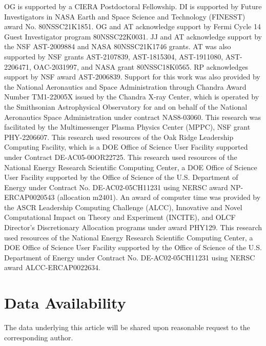 \documentclass[twocolumn,dvipsnames]{aastex62}
\begin{document}
\begin{acknowledgements}

OG is supported by a CIERA Postdoctoral Fellowship.
DI is supported by Future Investigators in NASA Earth and Space Science and Technology (FINESST) award No. 80NSSC21K1851. %
OG and AT acknowledge support by Fermi Cycle 14 Guest Investigator program 80NSSC22K0031.
JJ and AT acknowledge support by the NSF AST-2009884 and NASA 80NSSC21K1746 grants.
AT was also supported by NSF grants
AST-2107839, %
AST-1815304, %
AST-1911080, %
AST-2206471,
OAC-2031997, %
and NASA grant 80NSSC18K0565. %
RP acknowledges
support by NSF award AST-2006839.
Support for this work was also provided by the National Aeronautics and Space Administration through Chandra Award Number TM1-22005X issued by the Chandra X-ray Center, which is operated by the Smithsonian Astrophysical Observatory for and on behalf of the National Aeronautics Space Administration under contract NAS8-03060.  This research was facilitated by the Multimessenger Plasma Physics Center (MPPC), NSF grant PHY-2206607.
This research used resources of the Oak Ridge Leadership Computing Facility, which is a DOE Office of Science User Facility supported under Contract DE-AC05-00OR22725. This research used resources of the National Energy Research Scientific Computing Center, a DOE Office of Science User Facility supported by the Office of Science of the U.S. Department of Energy under Contract No. DE-AC02-05CH11231 using
NERSC award NP-ERCAP0020543 (allocation m2401). An award of computer time was provided by the ASCR Leadership Computing Challenge (ALCC), Innovative and Novel Computational Impact on Theory and Experiment (INCITE), and OLCF Director's Discretionary Allocation  programs under award PHY129. This research used resources of the National Energy Research Scientific Computing Center, a DOE Office of Science User Facility supported by the Office of Science of the U.S. Department of Energy under Contract No. DE-AC02-05CH11231 using NERSC award ALCC-ERCAP0022634.
    
\end{acknowledgements}

\section*{Data Availability}

The data underlying this article will be shared upon reasonable request to the corresponding author.
	
\end{document}

